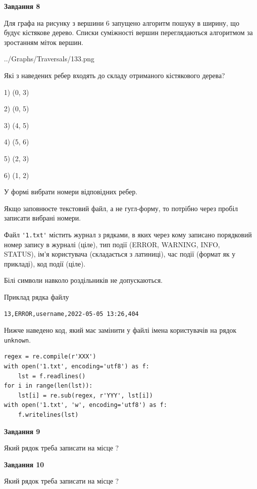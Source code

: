 \documentclass[12pt, ukrainian]{article}
\def\code#1{\Verb!#1!}
\begin{document}
{\begin {large}
{\begin {center}\textbf{Завдання 8}\end {center}}\par
Для графа на рисунку з вершини 6 запущено алгоритм пошуку в ширину, що будує кістякове дерево. Списки суміжності вершин переглядаються алгоритмом за зростанням міток вершин.\par
\begin{center}
	{../Graphs/Traversals/133.png}
\end{center}
\par Які з наведених ребер входять до складу отриманого кістякового дерева?\par
1) (0, 3)\par
2) (0, 5)\par
3) (4, 5)\par
4) (5, 6)\par
5) (2, 3)\par
6) (1, 2)\par
{\vskip 15pt} У формі вибрати номери відповідних ребер.


Якщо заповнюєте текстовий файл, а не гугл-форму, то потрібно через пробіл записа\-ти вибрані номери.\par
\newpage


Файл \code{'1.txt'} містить журнал з рядками, в яких через кому записано поряд\-ко\-вий номер запису в журналі (ціле), тип події (ERROR, WARNING, INFO, STATUS), ім'я користувача (складається з латиниці), час події (фор\-мат як у прикладі), код події (ціле).

Білі символи навколо роздільників не допускаються.

Приклад рядка файлу



\begin{verbatim}
13,ERROR,username,2022-05-05 13:26,404
\end{verbatim}


Нижче наведено код, який має замінити у файлі імена користувачів на рядок \code{unknown}.



\begin{verbatim}
regex = re.compile(r'XXX')
with open('1.txt', encoding='utf8') as f:
    lst = f.readlines()
for i in range(len(lst)):
    lst[i] = re.sub(regex, r'YYY', lst[i])
with open('1.txt', 'w', encoding='utf8') as f:
    f.writelines(lst)
\end{verbatim}




{\begin {center}\textbf{Завдання 9}\end {center}}\par
Який рядок треба записати на місце  ?\par
\vspace{5mm}


{\begin {center}\textbf{Завдання 10}\end {center}}\par
Який рядок треба записати на місце  ?\par


\newpage


\end {large}}
\end{document}
